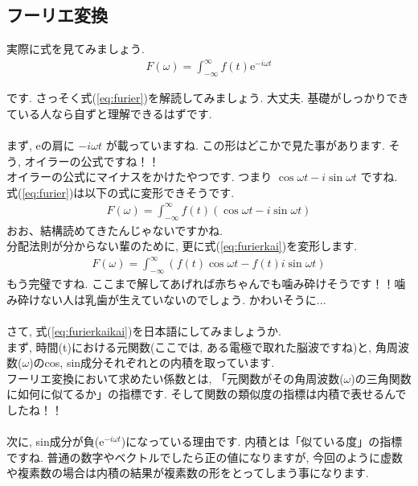 \documentclass[11pt,a4paper]{jreport}
\begin{document}
\subsection{フーリエ変換} 
実際に式を見てみましょう.\\
\begin{eqnarray}
F(\omega) = \int_{-\infty}^{\infty} f(t)\mathrm{e}^{-i\omega t}
\label{eq:furier}
\end{eqnarray}

です. さっそく式(\ref{eq:furier})を解読してみましょう. 大丈夫. 基礎がしっかりできている人なら自ずと理解できるはずです.\\
\\
まず, eの肩に $ -i\omega t $ が載っていますね. この形はどこかで見た事があります. そう, オイラーの公式ですね！！\\
オイラーの公式にマイナスをかけたやつです. つまり $ \cos\omega t  - i\sin\omega t $ ですね. \\
式(\ref{eq:furier})は以下の式に変形できそうです.\\
\begin{eqnarray}
F(\omega) = \int_{-\infty}^{\infty} f(t)(\cos\omega t - i\sin\omega t)
\label{eq:furierkai}
\end{eqnarray}
おお、結構読めてきたんじゃないですかね.\\
分配法則が分からない輩のために, 更に式(\ref{eq:furierkai})を変形します.\\
\begin{eqnarray}
F(\omega) = \int_{-\infty}^{\infty} (f(t)\cos\omega t - f(t)i\sin\omega t)
\label{eq:furierkaikai}
\end{eqnarray}
もう完璧ですね. ここまで解してあげれば赤ちゃんでも噛み砕けそうです！！噛み砕けない人は乳歯が生えていないのでしょう. かわいそうに...\\
\\
さて, 式(\ref{eq:furierkaikai})を日本語にしてみましょうか.\\
まず, 時間(t)における元関数(ここでは, ある電極で取れた脳波ですね)と, 角周波数($\omega$)のcos, sin成分それぞれとの内積を取っています. 
\\
フーリエ変換において求めたい係数とは, 「元関数がその角周波数($\omega$)の三角関数に如何に似てるか」の指標です. そして関数の類似度の指標は内積で表せるんでしたね！！\\
\\
次に, sin成分が負($\mathrm{e}^{-i\omega t}$)になっている理由です. 内積とは「似ている度」の指標ですね. 普通の数字やベクトルでしたら正の値になりますが, 今回のように虚数や複素数の場合は内積の結果が複素数の形をとってしまう事になります.\\
\end{document}
